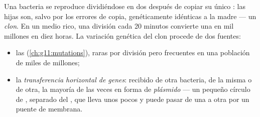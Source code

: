 \begin{proposition}\label{prop:g11:antibiotic-resistance:variation}
Una bacteria se reproduce dividiéndose en dos después de copiar su
único : las hijas son, salvo por los errores de copia,
genéticamente idénticas a la madre --- un \emph{clon}. En un medio
rico, una división cada 20 minutos convierte una  en mil millones
en diez horas. La variación genética del clon procede de dos fuentes:
\begin{itemize}
  \item las \emph{} (\cref{ch:g11:mutations}), raras por
        división pero frecuentes en una población de miles de millones;
  \item la \emph{transferencia horizontal de genes}:
         recibido de otra bacteria, de la misma  o de otra, la
        mayoría de las veces en forma de \emph{plásmido} --- un pequeño
        círculo de , separado del , que lleva unos pocos
         y puede pasar de una  a otra por un puente de
        membrana.
\end{itemize}
\end{proposition}
\admitted

